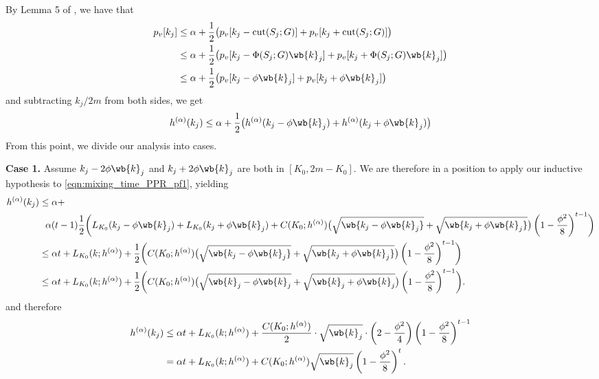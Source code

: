 	By Lemma 5 of \citet{andersen2006}, we have that
	\begin{align}
	p_v[k_j] & \leq \alpha + \frac{1}{2} \bigl(p_v[k_j - \mathrm{cut}(S_j;G)] + p_v[k_j + \mathrm{cut}(S_j;G)] \bigr) \nonumber\\
	& \leq \alpha + \frac{1}{2} \bigl(p_v[k_j - \Phi(S_j;G) \wb{k}_j] + p_v[k_j + \Phi(S_j;G) \wb{k}_j]  \bigr) \nonumber \\
	& \leq \alpha + \frac{1}{2} \bigl(p_v[k_j - \phi \wb{k}_j] + p_v[k_j + \phi \wb{k}_j]\bigr) \nonumber
	\end{align}
	and subtracting $k_j/2m$ from both sides, we get
	\begin{equation}
	\label{eqn:mixing_time_PPR_pf1}
	h^{(\alpha)}(k_j) \leq \alpha + \frac{1}{2} \bigl(h^{(\alpha)}(k_j - \phi \wb{k}_j) + h^{(\alpha)}(k_j +  \phi \wb{k}_j) \bigr)
	\end{equation}
	From this point, we divide our analysis into cases. 
	
	\textbf{Case 1.}
	Assume $k_j - 2 \phi \wb{k}_j$ and $k_j + 2 \phi \wb{k}_j$ are both in $[K_0,2m  - K_0]$. We are therefore in a position to apply our inductive hypothesis to \eqref{eqn:mixing_time_PPR_pf1}, yielding
	\begin{align*}
	h^{(\alpha)}(k_j) & \leq \alpha +~~ \\
	& ~~ \alpha(t-1) \frac{1}{2}\biggl(L_{K_0}(k_j - \phi \wb{k}_j) + L_{K_0}(k_j + \phi \wb{k}_j) + C(K_0;h^{(\alpha)})\bigl(\sqrt{\wb{k_j - \phi \wb{k}_j}} + \sqrt{\wb{k_j + \phi \wb{k}_j}}\bigr)\left(1 - \frac{\phi^2}{8}\right)^{t-1} \biggr) \\
	& \leq \alpha t + L_{K_0}(k;h^{(\alpha)}) + \frac{1}{2}\biggl(C(K_0;h^{(\alpha)})\bigl(\sqrt{\wb{k_j - \phi \wb{k}_j}} + \sqrt{\wb{k_j + \phi \wb{k}_j}}\bigr)\left(1 - \frac{\phi^2}{8}\right)^{t-1} \biggr) \\
	& \leq \alpha t + L_{K_0}(k;h^{(\alpha)}) + \frac{1}{2}\biggl(C(K_0;h^{(\alpha)})\bigl(\sqrt{\wb{k}_j - \phi \wb{k}_j} + \sqrt{\wb{k}_j + \phi \wb{k}_j}\bigr)\left(1 - \frac{\phi^2}{8}\right)^{t-1} \biggr).
	\end{align*}
	and therefore
	\begin{align*}
	h^{(\alpha)}(k_j) & \leq  \alpha t + L_{K_0}(k;h^{(\alpha)}) + \frac{C(K_0;h^{(\alpha)})}{2}\cdot \sqrt{\wb{k}_j}\cdot\left(2 - \frac{\phi^2}{4}\right)\left(1 - \frac{\phi^2}{8}\right)^{t-1} \\
	& = \alpha t + L_{K_0}(k;h^{(\alpha)}) + C(K_0;h^{(\alpha)})\sqrt{\wb{k}_j}\left(1 - \frac{\phi^2}{8}\right)^{t}.
	\end{align*}
	
